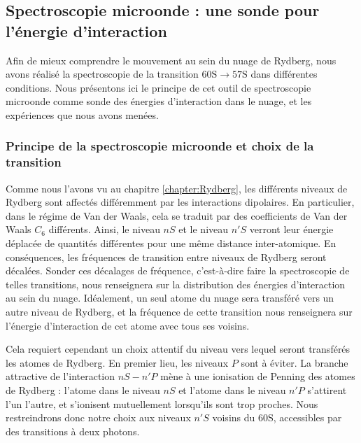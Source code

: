 	\subsection{Spectroscopie microonde : une sonde pour l'énergie d'interaction} \label{subsec:mw_spectro_exp}
\noindent Afin de mieux comprendre le mouvement au sein du nuage de Rydberg, nous avons réalisé la spectroscopie de la transition $\mathrm{60S} \rightarrow \mathrm{57S}$ dans différentes conditions.
Nous présentons ici le principe de cet outil de spectroscopie microonde comme sonde des énergies d'interaction dans le nuage, et les expériences que nous avons menées.

	\subsubsection*{Principe de la spectroscopie microonde et choix de la transition}
\noindent Comme nous l'avons vu au chapitre \ref{chapter:Rydberg}, les différents niveaux de Rydberg sont affectés différemment par les interactions dipolaires.
En particulier, dans le régime de Van der Waals, cela se traduit par des coefficients de Van der Waals $C_6$ différents.
Ainsi, le niveau $nS$ et le niveau $n'S$ verront leur énergie déplacée de quantités différentes pour une même distance inter-atomique.
En conséquences, les fréquences de transition entre niveaux de Rydberg seront décalées.
Sonder ces décalages de fréquence, c'est-à-dire faire la spectroscopie de telles transitions, nous renseignera sur la distribution des énergies d'interaction au sein du nuage.
Idéalement, un seul atome du nuage sera transféré vers un autre niveau de Rydberg, et la fréquence de cette transition nous renseignera sur l'énergie d'interaction de cet atome avec tous ses voisins.

Cela requiert cependant un choix attentif du niveau vers lequel seront transférés les atomes de Rydberg.
En premier lieu, les niveaux $P$ sont à éviter.
La branche attractive de l'interaction $nS - n'P$ mène à une ionisation de Penning des atomes de Rydberg : l'atome dans le niveau $nS$ et l'atome dans le niveau $n'P$ s'attirent l'un l'autre, et s'ionisent mutuellement lorsqu'ils sont trop proches.
Nous restreindrons donc notre choix aux niveaux $n'S$ voisins du $\mathrm{60S}$, accessibles par des transitions à deux photons.

